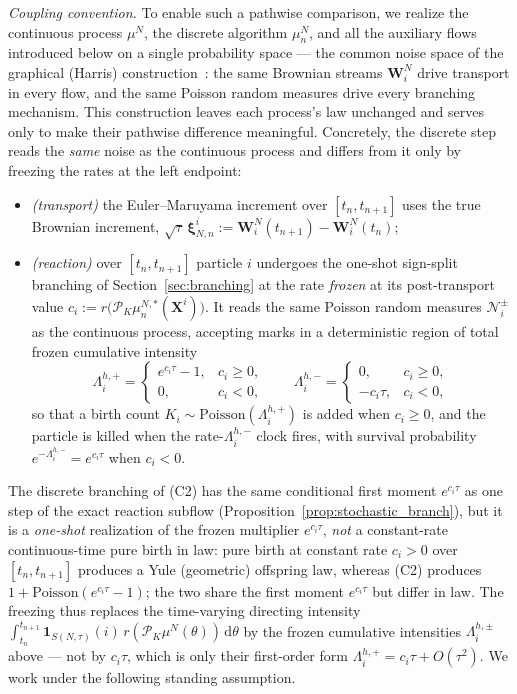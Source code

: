 \documentclass[a4paper,fleqn]{cas-sc}
\theoremstyle{definition}
\theoremstyle{remark}
\begin{document}
\emph{Coupling convention.} To enable such a pathwise comparison, we realize the
continuous process $\mu^N$, the discrete algorithm $\mu^N_n$, and all the auxiliary
flows introduced below on a single probability space --- the common noise space of the
graphical (Harris) construction~\cite{harris1972nearest,harris1978additive}: the same
Brownian streams $\mathbf W^N_i$ drive transport in every flow, and the same Poisson
random measures drive every branching mechanism. This construction leaves each process's
law unchanged and serves only to make their pathwise difference meaningful. Concretely,
the discrete step reads the \emph{same} noise as the continuous process and differs from
it only by freezing the rates at the left endpoint:
\begin{itemize}
\item[(C1)] \emph{(transport)} the Euler--Maruyama increment over $[t_n,t_{n+1}]$ uses the
true Brownian increment, $\sqrt{\tau}\,\boldsymbol\xi^i_{N,n}
:=\mathbf W^N_i(t_{n+1})-\mathbf W^N_i(t_n)$;
\item[(C2)] \emph{(reaction)} over $[t_n,t_{n+1}]$ particle $i$ undergoes the one-shot sign-split
branching of Section~\ref{sec:branching} at the rate \emph{frozen} at its post-transport value
$c_i:= r\!\big(\mathcal P_K\mu^{N,*}_n(\mathbf X^i)\big)$. It reads the same Poisson random measures
$\mathcal N^\pm_i$ as the continuous process, accepting marks in a deterministic region of total
frozen cumulative intensity
\[
\Lambda^{h,+}_i=\begin{cases}e^{c_i\tau}-1,&c_i\ge0,\\[2pt]0,&c_i<0,\end{cases}
\qquad
\Lambda^{h,-}_i=\begin{cases}0,&c_i\ge0,\\[2pt]-c_i\tau,&c_i<0,\end{cases}
\]
so that a birth count $K_i\sim\mathrm{Poisson}(\Lambda^{h,+}_i)$ is added when $c_i\ge0$, and the
particle is killed when the rate-$\Lambda^{h,-}_i$ clock fires, with survival probability
$e^{-\Lambda^{h,-}_i}=e^{c_i\tau}$ when $c_i<0$.
\end{itemize}
The discrete branching of (C2) has the same conditional first moment $e^{c_i\tau}$ as one step of the
exact reaction subflow (Proposition~\ref{prop:stochastic_branch}), but it is a \emph{one-shot}
realization of the frozen multiplier $e^{c_i\tau}$, \emph{not} a constant-rate continuous-time pure
birth in law: pure birth at constant rate $c_i>0$ over $[t_n,t_{n+1}]$ produces a Yule (geometric)
offspring law, whereas (C2) produces $1+\mathrm{Poisson}(e^{c_i\tau}-1)$; the two share the first
moment $e^{c_i\tau}$ but differ in law. The freezing thus replaces the time-varying directing intensity
$\int_{t_n}^{t_{n+1}}\mathbf 1_{S(N,\tau)}(i)\,r(\mathcal P_K\mu^N(\theta))\,\mathrm d\theta$ by the
frozen cumulative intensities $\Lambda^{h,\pm}_i$ above --- not by $c_i\tau$, which is only their
first-order form $\Lambda^{h,+}_i=c_i\tau+O(\tau^2)$. We work under the following standing assumption.
\end{document}
